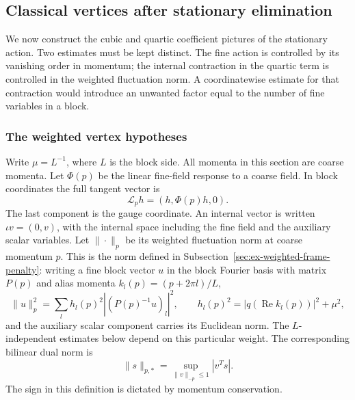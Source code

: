 \subsection{Classical vertices after stationary elimination}
\label{sec:ex-classical-stationary-vertices}

We now construct the cubic and quartic coefficient pictures of the
stationary action. Two estimates must be kept distinct. The fine action
is controlled by its vanishing order in momentum; the internal contraction
in the quartic term is controlled in the weighted fluctuation norm. A
coordinatewise estimate for that contraction would introduce an unwanted
factor equal to the number of fine variables in a block.

\subsubsection{The weighted vertex hypotheses}
Write $\mu=L^{-1}$, where $L$ is the block side. All momenta in this
section are coarse momenta. Let $\Phi(p)$ be the linear fine-field response
to a coarse field. In block coordinates the full tangent vector is
\[
        \mathcal L_p h=(h,\Phi(p)h,0).
\]
The last component is the gauge coordinate. An internal vector is written
$\iota v=(0,v)$, with the internal space including the fine field and the
auxiliary scalar variables. Let $\|\cdot\|_p$ be its weighted fluctuation
norm at coarse momentum $p$. This is the norm defined in
Subsection~\ref{sec:ex-weighted-frame-penalty}: writing a fine block vector
$u$ in the block Fourier basis with matrix $P(p)$ and alias momenta
$k_l(p)=(p+2\pi l)/L$,
\[
 \|u\|_p^2=\sum_l h_l(p)^2|(P(p)^{-1}u)_l|^2,\qquad
 h_l(p)^2=|q(\operatorname{Re}k_l(p))|^2+\mu^2,
\]
and the auxiliary scalar component carries its Euclidean norm. The
$L$-independent estimates below depend on this particular weight. The
corresponding bilinear dual norm is
\[
 \|s\|_{p,*}=\sup_{\|v\|_{-p}\leq1}|v^Ts|.
\]
The sign in this definition is dictated by momentum conservation.


